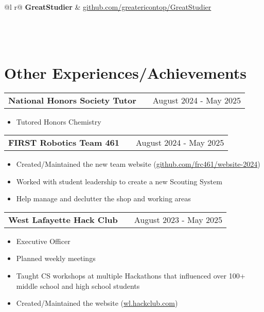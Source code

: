\documentclass[letter, 12pt]{article}
\makeatletter
\newenvironment{jobshort}[2]
    {
    \begin{tabularx}{\linewidth}{@{}l X r@{}}
    \textbf{#1} & \hfill & #2 \\[3.75pt]
    \end{tabularx}
    }
    {
    }
\makeatother
\begin{document}
\begin{tabularx}{\linewidth}{ @{}l r@{} }
    \textbf{GreatStudier} & \hfill \href{https://github.com/greatericontop/GreatStudier}{github.com/greatericontop/GreatStudier} \\[3.75pt]
     \\
     \\
     \\
\end{tabularx}

\section{Other Experiences/Achievements}

\begin{jobshort}{National Honors Society Tutor}{August 2024 - May 2025}
    \begin{itemize}
        \item Tutored Honors Chemistry
    \end{itemize}
\end{jobshort}

\begin{jobshort}{FIRST Robotics Team 461}{August 2024 - May 2025}
    \begin{itemize}
        \item Created/Maintained the new team website (\href{https://github.com/frc461/website-2024}{github.com/frc461/website-2024})
        \item Worked with student leadership to create a new Scouting System
        \item Help manage and declutter the shop and working areas
    \end{itemize}
\end{jobshort}

\begin{jobshort}{West Lafayette Hack Club}{August 2023 - May 2025}
    \begin{itemize}
        \item Executive Officer
        \item Planned weekly meetings
        \item Taught CS workshops at multiple Hackathons that influenced over 100+ middle school and high school students
        \item Created/Maintained the website (\href{https://wl.hackclub.com/}{wl.hackclub.com})
    \end{itemize}
\end{jobshort}
\end{document}
